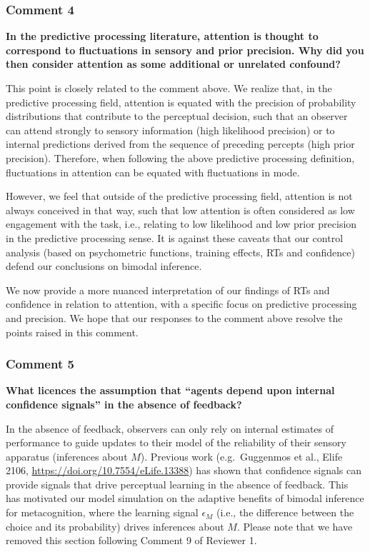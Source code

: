 \documentclass[
]{article}
\begin{document}
\hypertarget{comment-4}{%
\subsubsection{Comment 4}\label{comment-4}}

\textbf{In the predictive processing literature, attention is thought to
correspond to fluctuations in sensory and prior precision. Why did you
then consider attention as some additional or unrelated confound?}

This point is closely related to the comment above. We realize that, in
the predictive processing field, attention is equated with the precision
of probability distributions that contribute to the perceptual decision,
such that an observer can attend strongly to sensory information (high
likelihood precision) or to internal predictions derived from the
sequence of preceding percepts (high prior precision). Therefore, when
following the above predictive processing definition, fluctuations in
attention can be equated with fluctuations in mode.

However, we feel that outside of the predictive processing field,
attention is not always conceived in that way, such that low attention
is often considered as low engagement with the task, i.e., relating to
low likelihood and low prior precision in the predictive processing
sense. It is against these caveats that our control analysis (based on
psychometric functions, training effects, RTs and confidence) defend our
conclusions on bimodal inference.

We now provide a more nuanced interpretation of our findings of RTs and
confidence in relation to attention, with a specific focus on predictive
processing and precision. We hope that our responses to the comment
above resolve the points raised in this comment.

\hypertarget{comment-5}{%
\subsubsection{Comment 5}\label{comment-5}}

\textbf{What licences the assumption that ``agents depend upon internal
confidence signals'' in the absence of feedback?}

In the absence of feedback, observers can only rely on internal
estimates of performance to guide updates to their model of the
reliability of their sensory apparatus (inferences about \(M\)).
Previous work (e.g.~Guggenmos et al., Elife 2106,
\url{https://doi.org/10.7554/eLife.13388}) has shown that confidence
signals can provide signals that drive perceptual learning in the
absence of feedback. This has motivated our model simulation on the
adaptive benefits of bimodal inference for metacognition, where the
learning signal \(\epsilon_M\) (i.e., the difference between the choice
and its probability) drives inferences about \(M\). Please note that we
have removed this section following Comment 9 of Reviewer 1.
\end{document}
